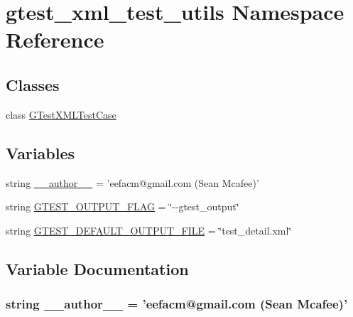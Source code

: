 \hypertarget{namespacegtest__xml__test__utils}{\section{gtest\-\_\-xml\-\_\-test\-\_\-utils \-Namespace \-Reference}
\label{d7/dc2/namespacegtest__xml__test__utils}
}
\subsection*{\-Classes}
\begin{DoxyCompactItemize}
\item 
class \hyperlink{classgtest__xml__test__utils_1_1GTestXMLTestCase}{\-G\-Test\-X\-M\-L\-Test\-Case}
\end{DoxyCompactItemize}
\subsection*{\-Variables}
\begin{DoxyCompactItemize}
\item 
string \hyperlink{namespacegtest__xml__test__utils_a629d61dfe4da763164a4d1a2d85b0afd}{\-\_\-\-\_\-author\-\_\-\-\_\-} = 'eefacm@gmail.\-com (\-Sean \-Mcafee)'
\item 
string \hyperlink{namespacegtest__xml__test__utils_abb51de98c0795d52837d2b1f941cce03}{\-G\-T\-E\-S\-T\-\_\-\-O\-U\-T\-P\-U\-T\-\_\-\-F\-L\-A\-G} = \char`\"{}-\/-\/gtest\-\_\-output\char`\"{}
\item 
string \hyperlink{namespacegtest__xml__test__utils_a365e0838bf48fd7b4fba71d9719f696e}{\-G\-T\-E\-S\-T\-\_\-\-D\-E\-F\-A\-U\-L\-T\-\_\-\-O\-U\-T\-P\-U\-T\-\_\-\-F\-I\-L\-E} = \char`\"{}test\-\_\-detail.\-xml\char`\"{}
\end{DoxyCompactItemize}


\subsection{\-Variable \-Documentation}
\hypertarget{namespacegtest__xml__test__utils_a629d61dfe4da763164a4d1a2d85b0afd}{
\subsubsection[{\-\_\-\-\_\-author\-\_\-\-\_\-}]{\setlength{\rightskip}{0pt plus 5cm}string {\bf \-\_\-\-\_\-author\-\_\-\-\_\-} = 'eefacm@gmail.\-com (\-Sean \-Mcafee)'}}\label{d7/dc2/namespacegtest__xml__test__utils_a629d61dfe4da763164a4d1a2d85b0afd}



